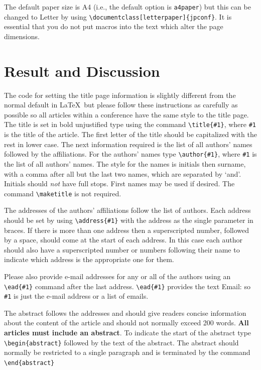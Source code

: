 \documentclass[a4paper]{jpconf}
\begin{document}
The default paper size is A4 (i.e., the default option is {\tt a4paper}) but this can be changed to Letter by
using \verb"\documentclass[letterpaper]{jpconf}". It is essential that you do not put macros into the text which alter the page dimensions.

\section{Result and Discussion}
The code for setting the title page information is slightly different from
the normal default in \LaTeX\ but please follow these instructions as carefully as possible so all articles within a conference have the same style to the title page.
The title is set in bold unjustified type using the command
\verb"\title{#1}", where \verb"#1" is the title of the article. The
first letter of the title should be capitalized with the rest in lower case.
The next information required is the list of all authors' names followed by
the affiliations. For the authors' names type \verb"\author{#1}",
where \verb"#1" is the
list of all authors' names. The style for the names is initials then
surname, with a comma after all but the last
two names, which are separated by `and'. Initials should {\it not} have
full stops. First names may be used if desired. The command \verb"\maketitle" is not
required.

The addresses of the authors' affiliations follow the list of authors.
Each address should be set by using
\verb"\address{#1}" with the address as the single parameter in braces.
If there is more
than one address then a superscripted number, followed by a space, should come at the start of
each address. In this case each author should also have a superscripted number or numbers following their name to indicate which address is the appropriate one for them.

Please also provide e-mail addresses for any or all of the authors using an \verb"\ead{#1}" command after the last address. \verb"\ead{#1}" provides the text Email: so \verb"#1" is just the e-mail address or a list of emails.

The abstract follows the addresses and
should give readers concise information about the content
of the article and should not normally exceed 200
words. {\bf All articles must include an abstract}. To indicate the start
of the abstract type \verb"\begin{abstract}" followed by the text of the
abstract.  The abstract should normally be restricted
to a single paragraph and is terminated by the command
\verb"\end{abstract}"
\end{document}
